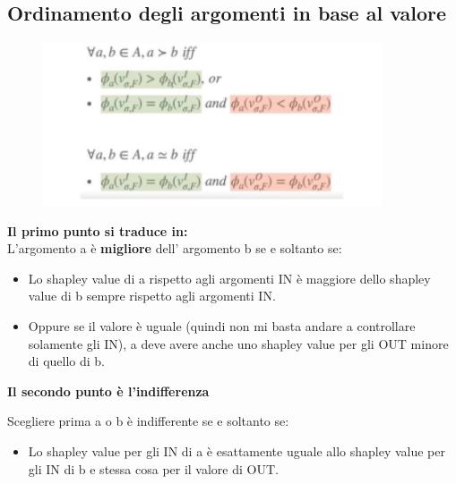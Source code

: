 \subsection{Ordinamento degli argomenti in base al valore}
\begin{figure}[htp]
	\centering
    \includegraphics[width=10cm, keepaspectratio]{img/Cap8/ordinamento-valore.png}
\end{figure}
\textbf{Il primo punto si traduce in:}
\\L’argomento a è \textbf{migliore} dell’ argomento b se e soltanto se:
\begin{itemize}
    \item Lo shapley value di a rispetto agli argomenti IN è maggiore dello shapley value di b sempre rispetto agli argomenti IN.
    \item Oppure se il valore è uguale (quindi non mi basta andare a controllare solamente gli IN), a deve avere anche uno shapley value per gli OUT minore di quello di b.
\end{itemize}
\begin{center}
     \textbf{Il secondo punto è l’indifferenza}
\end{center}
 Scegliere prima a o b è indifferente se e soltanto se:
\begin{itemize}
    \item Lo shapley value per gli IN di a è esattamente uguale allo shapley value per gli IN di b e stessa cosa per il valore di OUT. 
\end{itemize}
    
    
